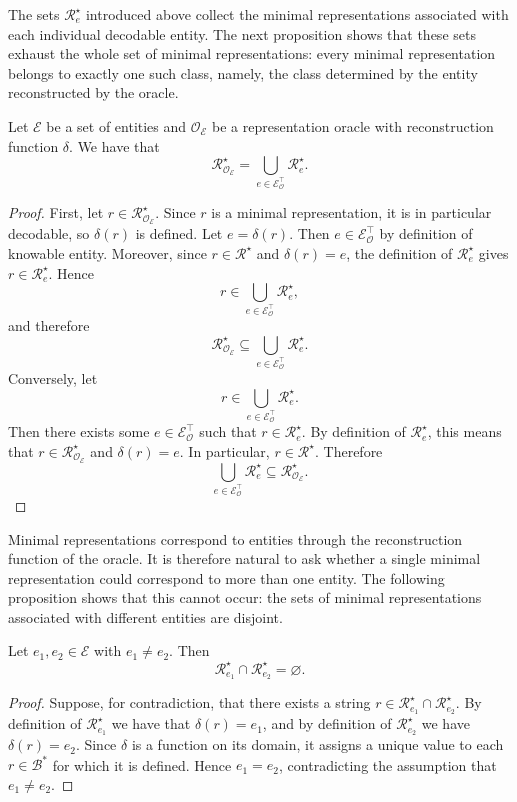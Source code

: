 The sets $\mathcal{R}^\star_{e}$ introduced above collect the minimal representations associated with each individual decodable entity. The next proposition shows that these sets exhaust the whole set of minimal representations: every minimal representation belongs to exactly one such class, namely, the class determined by the entity reconstructed by the oracle.

\begin{proposition}
Let $\mathcal{E}$ be a set of entities and $\mathcal{O}_\mathcal{E}$ be a representation oracle with reconstruction function $\delta$. We have that
\[
\mathcal{R}^{\star}_{\mathcal{O}_\mathcal{E}} = \bigcup_{e \in \mathcal{E}_{\mathcal{O}}^{\top}}\mathcal{R}^{\star}_{e}.
\]
\end{proposition}
\begin{proof}
First, let $r \in \mathcal{R}^{\star}_{\mathcal{O}_\mathcal{E}}$. Since $r$ is a minimal representation, it is in particular decodable, so $\delta(r)$ is defined. Let $e=\delta(r)$. Then $e\in\mathcal{E}_{\mathcal{O}}^{\top}$ by definition of knowable entity. Moreover, since $r \in \mathcal{R}^{\star}$ and $\delta(r)=e$, the definition of $\mathcal{R}^{\star}_{e}$ gives $r \in \mathcal{R}^{\star}_{e}$. Hence
\[
r\in \bigcup_{e\in\mathcal{E}_{\mathcal{O}}^{\top}}\mathcal{R}^{\star}_{e},
\]
and therefore
\[
\mathcal{R}^{\star}_{\mathcal{O}_\mathcal{E}} \subseteq \bigcup_{e\in\mathcal{E}_{\mathcal{O}}^{\top}}\mathcal{R}^{\star}_{e}.
\]
Conversely, let
\[
r\in \bigcup_{e\in\mathcal{E}_{\mathcal{O}}^{\top}}\mathcal{R}^{\star}_{e}.
\]
Then there exists some $e \in \mathcal{E}_{\mathcal{O}}^{\top}$ such that $r\in\mathcal{R}^{\star}_{e}$. By definition of $\mathcal{R}^{\star}_{e}$, this means that $r\in\mathcal{R}^{\star}_{\mathcal{O}_\mathcal{E}}$ and $\delta(r)=e$. In particular, $r\in\mathcal{R}^{\star}$. Therefore
\[
\bigcup_{e\in\mathcal{E}_{\mathcal{O}}^{\top}}\mathcal{R}^{\star}_{e}\subseteq \mathcal{R}^{\star}_{\mathcal{O}_\mathcal{E}}.
\]
\end{proof}

Minimal representations correspond to entities through the reconstruction function of the oracle. It is therefore natural to ask whether a single minimal representation could correspond to more than one entity. The following proposition shows that this cannot occur: the sets of minimal representations associated with different entities are disjoint.

\begin{proposition}
Let $e_1,e_2 \in \mathcal{E}$ with $e_1 \neq e_2$. Then
\[
\mathcal{R}^\star_{e_1} \cap \mathcal{R}^\star_{e_2} = \varnothing .
\]
\end{proposition}
\begin{proof}
Suppose, for contradiction, that there exists a string $r \in \mathcal{R}^\star_{e_1} \cap \mathcal{R}^\star_{e_2}$. By definition of $\mathcal{R}^\star_{e_1}$ we have that $\delta(r)=e_1$, and by definition of $\mathcal{R}^\star_{e_2}$ we have $\delta(r)=e_2$. Since $\delta$ is a function on its domain, it assigns a unique value to each $r \in \mathcal{B}^\ast$ for which it is defined. Hence $e_1=e_2$, contradicting the assumption that $e_1 \neq e_2$.
\end{proof}

